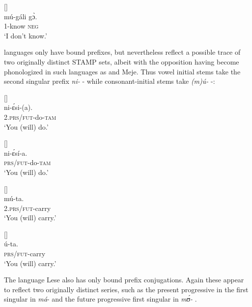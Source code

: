 \documentclass[output=paper]{langsci/langscibook}
\begin{document}
\ea\label{ex:anderson:59}
  \citep[91]{Boyeldieu1990}           []\\
\gll mú-gá{\downstep}li  g\`{ɔ}.\\
1-know  \textsc{neg}\\
\glt `I don't know.'  
\z

 languages only have bound prefixes, but nevertheless reflect a possible trace of two originally distinct STAMP sets, albeit with the opposition having become phonologized in such languages as  and Meje. Thus vowel initial stems take the second singular prefix \textit{ni-} - while consonant-initial stems take \textit{(m)ú-} -:


\newcommand{\andersonE}{\'{ɛ}}
\ea\label{ex:anderson:60}
 \citep[106]{Larochette1958}        []\\
\gll ni-{\andersonE}si-(a).      \\
2.\textsc{prs/fut}-do-\textsc{tam}        \\
\glt `You (will) do.' 
\z

\ea\label{ex:anderson:61}
 \citep[106]{Larochette1958}           []\\
\gll ni-{\andersonE}sí-a.\\
\textsc{prs/fut}-do-\textsc{tam}\\
\glt `You (will) do.' 
\z

\ea\label{ex:anderson:62}
 \citep[106-7]{Larochette1958}        []\\
\gll mú-ta.\\
2.\textsc{prs/fut}-carry    \\
\glt `You (will) carry.'     
\z

\ea\label{ex:anderson:63}
 \citep[106-7]{Larochette1958}        []\\
\gll ú-ta.\\
\textsc{prs/fut}-carry\\
\glt `You (will) carry.' 
\z

The  language Lese also has only bound prefix conjugations. Again these appear to reflect two originally distinct series, such as the present progressive in the first singular in \textit{má}-  and the future progressive first singular in \textit{m\'ʊ-} .
\end{document}
